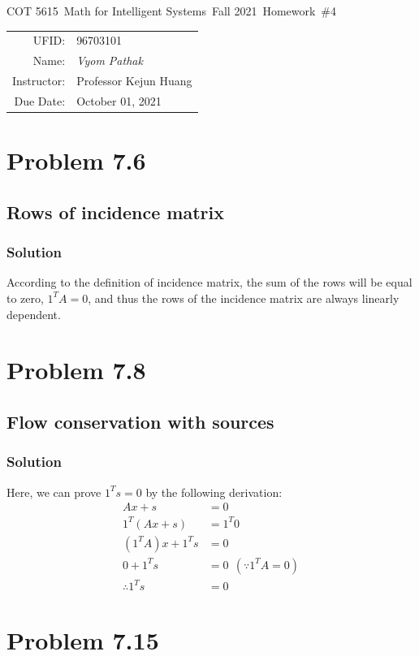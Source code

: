 \documentclass{article}
\newcommand{\hmwkTitle}{Homework\ \#4}
\newcommand{\hmwkDueDate}{October 01, 2021}
\newcommand{\hmwkClassCode}{COT 5615}
\newcommand{\hmwkClass}{Math for Intelligent Systems}
\newcommand{\hmwkClassYear}{Fall 2021}
\newcommand{\hmwkClassInstructor}{Professor Kejun Huang}
\newcommand{\hmwkAuthorName}{\textit{Vyom Pathak}}
\newcommand{\hmwkUFID}{96703101}
\begin{document}
\begin{center}
{\Large \hmwkClassCode\ \hmwkClass\ \hmwkClassYear\ \hmwkTitle}

\begin{tabular}{rl}
UFID: & \hmwkUFID \\
Name: & \hmwkAuthorName \\
Instructor: & \hmwkClassInstructor \\
Due Date: & \hmwkDueDate \\ 
\end{tabular}
\end{center}

\section*{Problem 7.6}
\subsection*{Rows of incidence matrix}
\subsubsection*{Solution}
According to the definition of incidence matrix, the sum of the rows will be equal to zero, $1^TA=0$, and thus the rows of the incidence matrix are always linearly dependent.
\section*{Problem 7.8}
\subsection*{Flow conservation with sources}
\subsubsection*{Solution}
Here, we can prove $1^Ts=0$ by the following derivation:
\begin{align*}
    Ax+s & = 0\\
    1^T(Ax+s) & = 1^T0\\
    (1^TA)x + 1^Ts & = 0\\
    0+1^Ts & = 0\ \ (\because 1^TA=0)\\
    \therefore 1^Ts & =0
\end{align*}
\section*{Problem 7.15}
\end{document}

